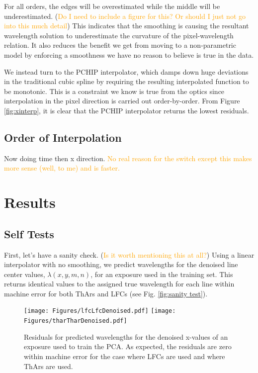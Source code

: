 \documentclass[12pt, letterpaper]{article}
\newcommand{\lz}[1]{\textcolor{orange}{#1}}
\begin{document}
For all orders, the edges will be overestimated while the middle will be underestimated.  (\lz{Do I need to include a figure for this?  Or should I just not go into this much detail})  This indicates that the smoothing is causing the resultant wavelength solution to underestimate the curvature of the pixel-wavelength relation.  It also reduces the benefit we get from moving to a non-parametric model by enforcing a smoothness we have no reason to believe is true in the data.

We instead turn to the PCHIP interpolator, which damps down huge deviations in the traditional cubic spline by requiring the resulting interpolated function to be monotonic.  This is a constraint we know is true from the optics since interpolation in the pixel direction is carried out order-by-order.  From Figure \ref{fig:xinterp}, it is clear that the PCHIP interpolator returns the lowest residuals.

\subsection{Order of Interpolation}
Now doing time then x direction.  \lz{No real reason for the switch except this makes more sense (well, to me) and is faster.}


\section{Results} \label{sec:results}
\subsection{Self Tests} \label{sec:test-self}
First, let's have a sanity check.  (\lz{Is it worth mentioning this at all?}) Using a linear interpolator with no smoothing, we predict wavelengths for the denoised line center values, $\lambda(x,y,m,n)$, for an exposure used in the training set.  This returns identical values to the assigned true wavelength for each line within machine error for both ThArs and LFCs (see Fig. \ref{fig:sanity test}).

\begin{figure}[h]
\centering
\texttt{[image: Figures/lfcLfcDenoised.pdf]}
\texttt{[image: Figures/tharTharDenoised.pdf]}
\caption{Residuals for predicted wavelengths for the denoised x-values of an exposure used to train the PCA.   As expected, the residuals are zero within machine error for the case where LFCs are used and where ThArs are used.}
\label{fig:sanityTest}
\end{figure} 
\end{document}
